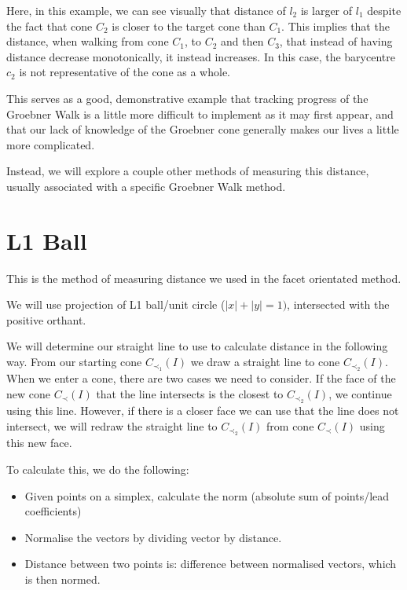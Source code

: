 \documentclass[12pt,a4paper]{report}
\begin{document}
Here, in this example, we can see visually that distance of $l_{2}$ is larger of $l_{1}$ despite the fact that cone $C_{2}$ is closer to the target cone than $C_{1}$. This implies that the distance, when walking from cone $C_{1}$, to $C_{2}$ and then $C_{3}$, that instead of having distance decrease monotonically, it instead increases. In this case, the barycentre $c_{2}$ is not representative of the cone as a whole. 

This serves as a good, demonstrative example that tracking progress of the Groebner Walk is a little more difficult to implement as it may first appear, and that our lack of knowledge of the Groebner cone generally makes our lives a little more complicated.

Instead, we will explore a couple other methods of measuring this distance, usually associated with a specific Groebner Walk method.

\section{L1 Ball}
This is the method of measuring distance we used in the facet orientated method.

We will use projection of L1 ball/unit circle ($|x| + |y| = 1)$, intersected with the positive orthant.


We will determine our straight line to use to calculate distance in the following way. From our starting cone $C_{\prec_{1}} (I)$ we draw a straight line to cone $C_{\prec_{2}} (I)$. When we enter a cone, there are two cases we need to consider. If the face of the new cone $C_{\prec} (I)$ that the line intersects is the closest to $C_{\prec_{2}} (I)$, we continue using this line. However, if there is a closer face we can use that the line does not intersect, we will redraw the straight line to $C_{\prec_{2}} (I)$ from cone $C_{\prec} (I)$ using this new face.

To calculate this, we do the following:
\begin{itemize}
    \item Given points on a simplex, calculate the norm (absolute sum of points/lead coefficients)
    \item Normalise the vectors by dividing vector by distance.
    \item Distance between two points is: difference between normalised vectors, which is then normed. 
\end{itemize}
\end{document}
